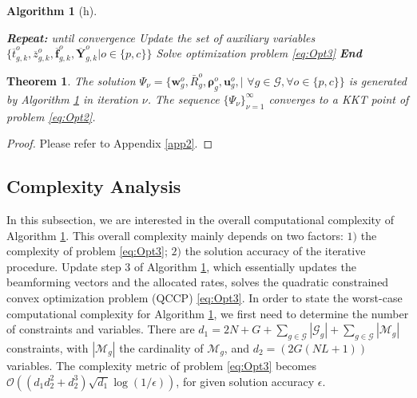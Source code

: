 \documentclass[12pt,draftcls,onecolumn]{IEEEtran}
\newtheorem{theorem}{Theorem}
\newtheorem{algorithm}{Algorithm}
\theoremstyle{remark}
\theoremstyle{definition}
\begin{document}
{\begin{algorithm}[h]
\begin{spacing}{1.1}
\begin{algorithmic}[1]
		\STATE \textbf{Repeat:} until convergence 
		\STATE Update the set of auxiliary variables $\{ \overline{t}_{g,k}^o, \overline{z}_{g,k}^o, \overline{\mathbf{f}}_{g,k}^o, \overline{\mathbf{Y}}_{g,k}^o | o\in\{ p,c \} \}$
		\STATE Solve optimization problem \eqref{eq:Opt3}
		\STATE \textbf{End}  
	\end{algorithmic}
	\end{spacing}
	\label{alg}
\end{algorithm}%
\begin{theorem} \label{KKT}
	The solution $\Psi_\nu = \{ \mathbf{w}_{g}^o, \bar{R}_{g}^{o}, {\bm \rho}_g^o,\mathbf{u}_g^o,|\,\, \forall g \in \mathcal{G}, \forall o \in\{p,c\} \} $ is generated by Algorithm \ref{alg} in iteration $\nu$. The sequence $\{ \Psi_\nu \}_{\nu=1}^{\infty}$ converges to a KKT point of problem \eqref{eq:Opt2}.
\end{theorem}
\begin{proof}
	Please refer to Appendix \ref{app2}.
\end{proof}
\subsection{Complexity Analysis}
In this subsection, we are interested in the overall computational complexity of Algorithm \ref{alg}. This overall complexity mainly depends on two factors: $1)$ the complexity of problem \eqref{eq:Opt3}; $2)$ the solution accuracy of the iterative procedure. Update step $3$ of Algorithm \ref{alg}, which essentially updates the beamforming vectors and the allocated rates, solves the quadratic constrained convex optimization problem (QCCP) \eqref{eq:Opt3}. In order to state the worst-case computational complexity for Algorithm \ref{alg}, we first need to determine the number of constraints and variables. There are $d_1 = 2N+G+\sum_{g\in\mathcal{G}}|\mathcal{G}_g|+\sum_{g\in\mathcal{G}}|\mathcal{M}_g|$ constraints, with $|\mathcal{M}_g|$ the cardinality of $\mathcal{M}_g$, and $d_2 = (2G(NL+1))$ variables. The complexity metric of problem \eqref{eq:Opt3} becomes $\mathcal{O}((d_1 d_2^2 + d_2^3)\sqrt{d_1}\log(1/\epsilon))$, for given solution accuracy $\epsilon$. %
}
\end{document}
